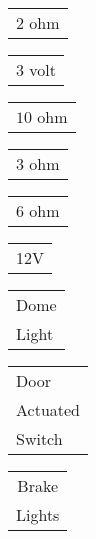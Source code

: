 \documentclass{book}
\begin{document}
\stopmpxshipout
\mpxshipout%
{\small \renewcommand{\arraystretch}{.9}
                \circuitfont\begin{tabular}{@{}l}
                   $2$ ohm 
	        \end{tabular}}%
\stopmpxshipout
\mpxshipout%
{\small \renewcommand{\arraystretch}{.9}
                \circuitfont\begin{tabular}{@{}r}
                   $3$ volt 
	        \end{tabular}}%
\stopmpxshipout
\mpxshipout%
{\small \renewcommand{\arraystretch}{.9}
                \circuitfont\begin{tabular}[b]{@{}c}
                   $10$ ohm 
	        \end{tabular}}%
\stopmpxshipout
\mpxshipout%
{\small \renewcommand{\arraystretch}{.9}
                \circuitfont\begin{tabular}[t]{@{}c}
                   $3$ ohm 
	        \end{tabular}}%
\stopmpxshipout
\mpxshipout%
{\small \renewcommand{\arraystretch}{.9}
                \circuitfont\begin{tabular}{@{}r}
                   $6$ ohm 
	        \end{tabular}}%
\stopmpxshipout
\mpxshipout%
{\small \renewcommand{\arraystretch}{.9}
                \circuitfont\begin{tabular}{@{}l}
                   12V \\
	        \end{tabular}}%
\stopmpxshipout
\mpxshipout%
{\small\renewcommand{\arraystretch}{.9}
                \circuitfont\begin{tabular}{@{}l}
                   Dome \\ Light
	        \end{tabular}}%
\stopmpxshipout
\mpxshipout%
{\small \renewcommand{\arraystretch}{.9}
                \circuitfont\begin{tabular}{@{}l}
                   Door \\ Actuated \\ Switch
	        \end{tabular}}%
\stopmpxshipout
\mpxshipout%
{\small \renewcommand{\arraystretch}{.9}
                \circuitfont\begin{tabular}[t]{@{}c}
                   Brake \\  Lights
	        \end{tabular}}%
\end{document}
